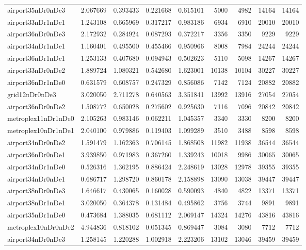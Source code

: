 \begin{longtable}{|l|r|r|r|r|r|r|r|r|}
airport35nDr0nDe3 & 2.067669 & 0.393433 & 0.221668 & 0.615101 & 5000 & 4982 & 14164 & 14164 \\
airport33nDr1nDe1 & 1.243108 & 0.665969 & 0.317217 & 0.983186 & 6934 & 6910 & 20010 & 20010 \\
airport36nDr0nDe3 & 2.172932 & 0.284924 & 0.087293 & 0.372217 & 3356 & 3350 & 9229 & 9229 \\
airport34nDr1nDe1 & 1.160401 & 0.495500 & 0.455466 & 0.950966 & 8008 & 7984 & 24244 & 24244 \\
airport36nDr1nDe1 & 1.253133 & 0.407680 & 0.094943 & 0.502623 & 5110 & 5098 & 14267 & 14267 \\
airport33nDr0nDe2 & 1.889724 & 1.080321 & 0.542680 & 1.623001 & 10138 & 10104 & 30227 & 30227 \\
airport36nDr1nDe0 & 0.631579 & 0.608757 & 0.247329 & 0.856086 & 7142 & 7124 & 20882 & 20882 \\
grid12nDr0nDe3 & 3.020050 & 2.711278 & 0.640563 & 3.351841 & 13992 & 13916 & 27054 & 27054 \\
airport36nDr0nDe2 & 1.508772 & 0.650028 & 0.275602 & 0.925630 & 7116 & 7096 & 20842 & 20842 \\
metroplex11nDr1nDe0 & 2.105263 & 0.983146 & 0.062211 & 1.045357 & 3340 & 3330 & 8200 & 8200 \\
metroplex10nDr1nDe1 & 2.040100 & 0.979886 & 0.119403 & 1.099289 & 3510 & 3488 & 8598 & 8598 \\
airport34nDr0nDe2 & 1.591479 & 1.162363 & 0.706145 & 1.868508 & 11982 & 11938 & 36544 & 36544 \\
airport36nDr0nDe1 & 3.939850 & 0.971983 & 0.367260 & 1.339243 & 10018 & 9986 & 30065 & 30065 \\
airport34nDr1nDe0 & 0.526316 & 1.362195 & 0.886424 & 2.248619 & 13028 & 12978 & 39355 & 39355 \\
airport34nDr0nDe1 & 0.686717 & 1.298720 & 0.860178 & 2.158898 & 13090 & 13038 & 39447 & 39447 \\
airport38nDr0nDe3 & 1.646617 & 0.430065 & 0.160028 & 0.590093 & 4840 & 4822 & 13371 & 13371 \\
airport38nDr1nDe1 & 3.020050 & 0.364378 & 0.131484 & 0.495862 & 3756 & 3744 & 9891 & 9891 \\
airport35nDr1nDe0 & 0.473684 & 1.388035 & 0.681112 & 2.069147 & 14324 & 14276 & 43816 & 43816 \\
metroplex10nDr0nDe2 & 4.944836 & 0.818102 & 0.051345 & 0.869447 & 3084 & 3080 & 7712 & 7712 \\
airport34nDr0nDe3 & 1.258145 & 1.220288 & 1.002918 & 2.223206 & 13102 & 13046 & 39459 & 39459 \\

\end{longtable}
